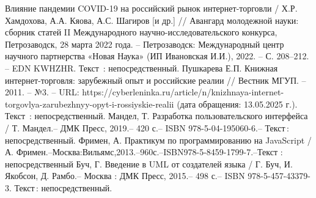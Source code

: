 \begin{thebibliography}{9}
	 Влияние пандемии COVID-19 на российский рынок интернет-торговли / Х.Р. Хамдохова, А.А. Кяова, А.С. Шагиров [и др.] // Авангард молодежной науки: сборник статей II Международного научно-исследовательского конкурса, Петрозаводск, 28 марта 2022 года. – Петрозаводск: Международный центр научного партнерства «Новая Наука» (ИП Ивановская И.И.), 2022. – С. 208–212. – EDN KWHZHR. Текст~: непосредственный.
	 Пушкарева Е.П. Книжная интернет-торговля: зарубежный опыт и российские реалии // Вестник МГУП. – 2011. – №3. – URL: https://cyberleninka.ru/article/n/knizhnaya-internet-torgovlya-zarubezhnyy-opyt-i-rossiyskie-realii (дата обращения: 13.05.2025 г.).  Текст~: непосредственный.
   \bibitem{} Мандел, Т. Разработка пользовательского интерфейса / Т. Мандел.– ДМК Пресс, 2019.– 420 с.– ISBN 978-5-04-195060-6.– Текст :
   непосредственный.
   \bibitem{}  Фримен, А. Практикум по программированию на JavaScript / А.
   Фримен.–Москва:Вильямс,2013.–960с.–ISBN978-5-8459-1799-7.–Текст
   : непосредственный
   \bibitem{} Буч, Г. Введение в UML от создателей языка / Г. Буч, И. Якобсон,
   Д. Рамбо.– Москва : ДМК Пресс, 2015.– 498 с.– ISBN 978-5-457-43379-3.
   Текст : непосредственный.
\end{thebibliography}
